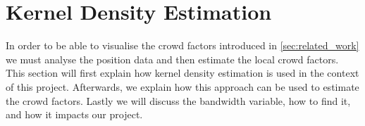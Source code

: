 \section{Kernel Density Estimation}
\label{sec:kernelDensityEstimation}
In order to be able to visualise the crowd factors introduced in \cref{sec:related_work} we must analyse the position data and then estimate the local crowd factors. This section will first explain how kernel density estimation is used in the context of this project. Afterwards, we explain how this approach can be used to estimate the crowd factors. Lastly we will discuss the bandwidth variable, how to find it, and how it impacts our project.





